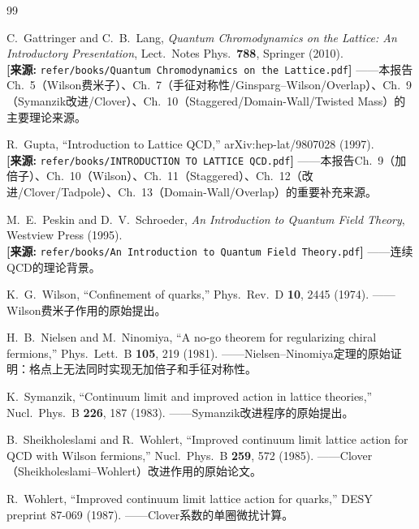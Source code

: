 \documentclass[12pt,a4paper]{ctexart}
\theoremstyle{definition}
\begin{document}
\begin{thebibliography}{99}

C.~Gattringer and C.~B.~Lang,
\textit{Quantum Chromodynamics on the Lattice: An Introductory Presentation},
Lect.\ Notes Phys.\ \textbf{788}, Springer (2010).
\\\textbf{[来源:} \texttt{refer/books/Quantum Chromodynamics on the Lattice.pdf}\textbf{]}
——本报告Ch.~5（Wilson费米子）、Ch.~7（手征对称性/Ginsparg--Wilson/Overlap）、Ch.~9（Symanzik改进/Clover）、Ch.~10（Staggered/Domain-Wall/Twisted Mass）的主要理论来源。

R.~Gupta,
``Introduction to Lattice QCD,''
arXiv:hep-lat/9807028 (1997).
\\\textbf{[来源:} \texttt{refer/books/INTRODUCTION TO LATTICE QCD.pdf}\textbf{]}
——本报告Ch.~9（加倍子）、Ch.~10（Wilson）、Ch.~11（Staggered）、Ch.~12（改进/Clover/Tadpole）、Ch.~13（Domain-Wall/Overlap）的重要补充来源。

M.~E.~Peskin and D.~V.~Schroeder,
\textit{An Introduction to Quantum Field Theory},
Westview Press (1995).
\\\textbf{[来源:} \texttt{refer/books/An Introduction to Quantum Field Theory.pdf}\textbf{]}
——连续QCD的理论背景。

K.~G.~Wilson,
``Confinement of quarks,''
Phys.\ Rev.\ D \textbf{10}, 2445 (1974).
——Wilson费米子作用的原始提出。

H.~B.~Nielsen and M.~Ninomiya,
``A no-go theorem for regularizing chiral fermions,''
Phys.\ Lett.\ B \textbf{105}, 219 (1981).
——Nielsen--Ninomiya定理的原始证明：格点上无法同时实现无加倍子和手征对称性。

K.~Symanzik,
``Continuum limit and improved action in lattice theories,''
Nucl.\ Phys.\ B \textbf{226}, 187 (1983).
——Symanzik改进程序的原始提出。

B.~Sheikholeslami and R.~Wohlert,
``Improved continuum limit lattice action for QCD with Wilson fermions,''
Nucl.\ Phys.\ B \textbf{259}, 572 (1985).
——Clover（Sheikholeslami--Wohlert）改进作用的原始论文。

R.~Wohlert,
``Improved continuum limit lattice action for quarks,''
DESY preprint 87-069 (1987).
——Clover系数的单圈微扰计算。


\end{thebibliography}
\end{document}
